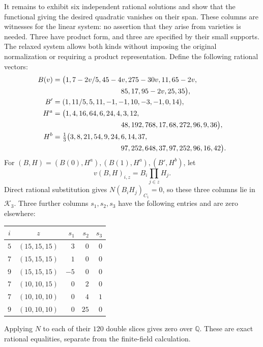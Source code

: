 It remains to exhibit six independent rational solutions and show that
the functional giving the desired quadratic vanishes on their span.
These columns are witnesses for the linear system: no assertion that
they arise from varieties is needed. Three have product form, and
three are specified by their small supports. The relaxed system
allows both kinds without imposing the original normalization or
requiring a product representation.
Define the following rational vectors:
\begin{align*}
 B(v)={}&\bigl(1,7-2v/5,45-4v,275-30v,11,65-2v,\\
             &\hspace{29mm}85,17,95-2v,25,35\bigr),\\
 B'={}&(1,11/5,5,11,-1,-1,10,-3,-1,0,14),\\
 H^a={}&\bigl(1,4,16,64,6,24,4,3,12,\\
       &\hspace{29mm}48,192,768,17,68,272,96,9,36\bigr),\\
 H^b={}&\tfrac13\bigl(3,8,21,54,9,24,6,14,37,\\
       &\hspace{29mm}97,252,648,37,97,252,96,16,42\bigr).
\end{align*}
For $(B,H)=(B(0),H^a),(B(1),H^a),(B',H^b)$, let
\[
 v(B,H)_{i,z}=B_i\prod_{j\in z}H_j.
\]
Direct rational substitution gives
$N(B_iH_j)_{C_1}=0$, so these three columns lie in $\mathcal K_3$.
Three further columns $s_1,s_2,s_3$ have the following entries and
are zero elsewhere:
\begin{center}
\begin{tabular}{c|c|rrr}
$i$ & $z$ & $s_1$ & $s_2$ & $s_3$\\\hline
$5$ & $(15,15,15)$ & $3$ & $0$ & $0$\\
$7$ & $(15,15,15)$ & $1$ & $0$ & $0$\\
$9$ & $(15,15,15)$ & $-5$ & $0$ & $0$\\
$7$ & $(10,10,15)$ & $0$ & $2$ & $0$\\
$7$ & $(10,10,10)$ & $0$ & $4$ & $1$\\
$9$ & $(10,10,10)$ & $0$ & $25$ & $0$
\end{tabular}
\end{center}
Applying $N$ to each of their $120$ double slices gives zero over
$\mathbb Q$. These are exact rational equalities, separate from
the finite-field calculation.

